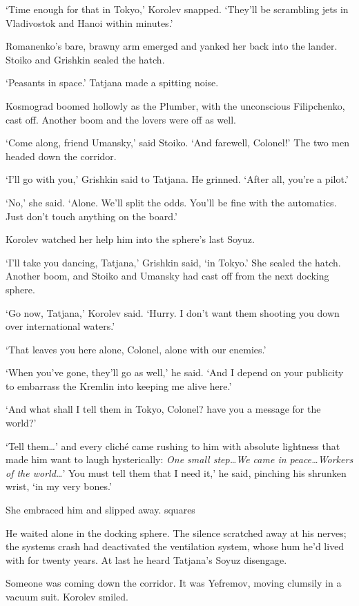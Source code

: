 `Time enough for that in Tokyo,' Korolev snapped. `They'll be scrambling jets in Vladivostok and Hanoi within minutes.'

Romanenko's bare, brawny arm emerged and yanked her back into the lander. Stoiko and Grishkin sealed the hatch.

`Peasants in space.' Tatjana made a spitting noise.

Kosmograd boomed hollowly as the Plumber, with the unconscious Filipchenko, cast off. Another boom and the lovers were off as well.

`Come along, friend Umansky,' said Stoiko. `And farewell, Colonel!' The two men headed down the corridor.

`I'll go with you,' Grishkin said to Tatjana. He grinned. `After all, you're a pilot.'

`No,' she said. `Alone. We'll split the odds. You'll be fine with the automatics. Just don't touch anything on the board.'

Korolev watched her help him into the sphere's last Soyuz.

`I'll take you dancing, Tatjana,' Grishkin said, `in Tokyo.' She sealed the hatch. Another boom, and Stoiko and Umansky had cast off from the next docking sphere.

`Go now, Tatjana,' Korolev said. `Hurry. I don't want them shooting you down over international waters.'

`That leaves you here alone, Colonel, alone with our enemies.'

`When you've gone, they'll go as well,' he said. `And I depend on your publicity to embarrass the Kremlin into keeping me alive here.'

`And what shall I tell them in Tokyo, Colonel? have you a message for the world?'

`Tell them\ldots' and every cliché came rushing to him with absolute lightness that made him want to laugh hysterically: \textit{One small step\ldots We came in peace\ldots Workers of the world\ldots}' You must tell them that I need it,' he said, pinching his shrunken wrist, `in my very bones.'

She embraced him and slipped away.
squares

He waited alone in the docking sphere. The silence scratched away at his nerves; the systems crash had deactivated the ventilation system, whose hum he'd lived with for twenty years. At last he heard Tatjana's Soyuz disengage.

Someone was coming down the corridor. It was Yefremov, moving clumsily in a vacuum suit. Korolev smiled.

